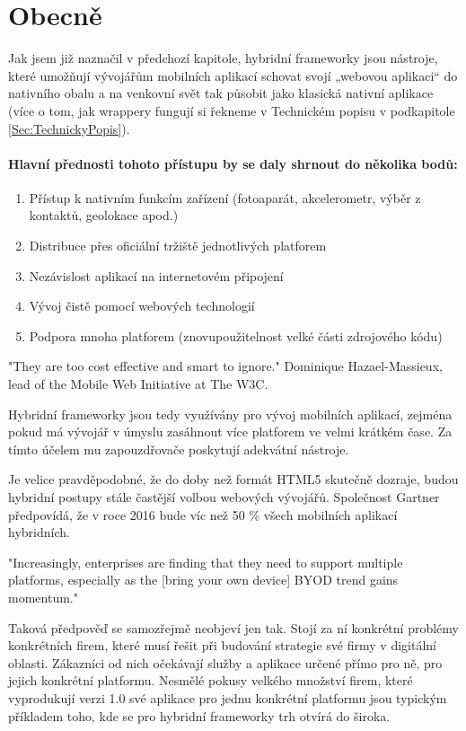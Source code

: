 \section{Obecně}
Jak jsem již naznačil v předchozí kapitole, hybridní frameworky jsou nástroje, které umožňují vývojářům mobilních aplikací schovat svojí „webovou aplikaci“ do nativního obalu a na venkovní svět tak působit jako klasická nativní aplikace (více o tom, jak wrappery fungují si řekneme v Technickém popisu v podkapitole \ref{Sec:TechnickyPopis}).

\paragraph{Hlavní přednosti tohoto přístupu by se daly shrnout do několika bodů:}
\begin{enumerate}
        \item Přístup k nativním funkcím zařízení (fotoaparát, akcelerometr, výběr z kontaktů, geolokace apod.)
        \item Distribuce přes oficiální tržiště jednotlivých platforem
        \item Nezávislost aplikací na internetovém připojení
        \item Vývoj čistě pomocí webových technologií
        \item Podpora mnoha platforem (znovupoužitelnost velké části zdrojového kódu)
\end{enumerate}

"They are too cost effective and smart to ignore." Dominique Hazael-Massieux, lead of the Mobile Web Initiative at The W3C. \cite{bii_hybrid_apps_report}

Hybridní frameworky jsou tedy využívány pro vývoj mobilních aplikací, zejména pokud má vývojář v úmyslu zasáhnout více platforem ve velmi krátkém čase. Za tímto účelem mu zapouzdřovače poskytují adekvátní nástroje.

Je velice pravděpodobné, že do doby než formát HTML5 skutečně dozraje, budou hybridní postupy stále častější volbou webových vývojářů. Společnost Gartner předpovídá, že v roce 2016 bude víc než 50 \% všech mobilních aplikací hybridních. \cite{gartner_says_50}

"Increasingly, enterprises are finding that they need to support multiple platforms, especially as the [bring your own device] BYOD trend gains momentum."\cite{gartner_says_50}

Taková předpověď se samozřejmě neobjeví jen tak. Stojí za ní konkrétní problémy konkrétních firem, které musí řešit při budování strategie své firmy v digitální oblasti. Zákazníci od nich očekávají služby a aplikace určené přímo pro ně, pro jejich konkrétní platformu. Nesmělé pokusy velkého množství firem, které vyprodukují verzi 1.0 své aplikace pro jednu konkrétní platformu jsou typickým příkladem toho, kde se pro hybridní frameworky trh otvírá do široka.

